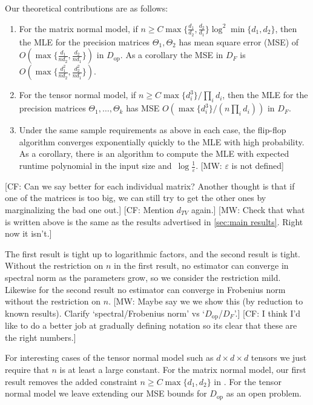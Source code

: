 \documentclass[aos]{imsart}
\theoremstyle{definition}
\numberwithin{equation}{section}
\DeclareMathOperator{\op}{op}
\newcommand{\eps}{\varepsilon}
\newcommand{\CF}[1]{{\color{purple}[CF: #1]}}
\newcommand{\MW}[1]{{\color{red}[MW: #1]}}
\begin{document}
Our theoretical contributions are as follows:
\begin{enumerate}
\item For the matrix normal model, if $n \geq C \max\{\frac{d_1}{d_2},\frac{d_2}{d_1}\} \log^2 \min\{d_1,d_2\}$, then the MLE for the precision matrices $\Theta_1, \Theta_2$ has mean square error (MSE) of $O( \max\{ \frac{d_1}{nd_2}, \frac{d_2}{nd_1} \} )$ in $D_{\op}$.
As a corollary the MSE in $D_F$ is $O( \max \{ \frac{d_1^2}{nd_2}, \frac{d_2^2}{nd_1} \} )$.
\item For the tensor normal model, if $n \geq C \max\{d_i^3\}/ \prod_i d_i$, then the MLE for the precision matrices $\Theta_1, \dots, \Theta_k$ has MSE $O(\max \{ d_i^3 \} / (n \prod_i d_i ) )$ in $D_F$.
\item Under the same sample requirements as above in each case, the flip-flop algorithm converges exponentially quickly to the MLE with high probability. As a corollary, there is an algorithm to compute the MLE with expected runtime polynomial in the input size and~$\log\frac1\eps$.
\MW{$\eps$ is not defined}
\end{enumerate}
\CF{Can we say better for each individual matrix? Another thought is that if one of the matrices is too big, we can still try to get the other ones by marginalizing the bad one out.}
\CF{Mention $d_{TV}$ again.}
\MW{Check that what is written above is the same as the results advertised in \cref{sec:main results}. Right now it isn't.}

The first result is tight up to logarithmic factors, and the second result is tight.
Without the restriction on $n$ in the first result, no estimator can converge in spectral norm as the parameters grow, so we consider the restriction mild. Likewise for the second result no estimator can converge in Frobenius norm without the restriction on $n$.
\MW{Maybe say we we show this (by reduction to known results). Clarify `spectral/Frobenius norm' vs `$D_{\op}$/$D_F$'.}
\CF{I think I'd like to do a better job at gradually defining notation so its clear that these are the right numbers.}

For interesting cases of the tensor normal model such as $d\times d \times d$ tensors we just require that $n$ is at least a large constant.
For the matrix normal model, our first result removes the added constraint $n \geq C \max\{d_1,d_2\}$ in \cite{tsiligkaridis2013convergence}.
For the tensor normal model we leave extending our MSE bounds for $D_{\op}$ as an open problem.
\end{document}
